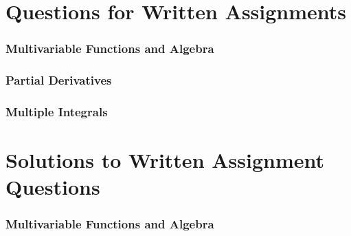\documentclass{article}
\begin{document}
\maketitle  %
\tableofcontents
\newpage
\part{Questions for Written Assignments}
\setcounter{section}{1}
\section{Multivariable Functions and Algebra}
\newpage %
\section{Partial Derivatives} %
\newpage %
\section{Multiple Integrals}





\newpage
\part{Solutions to Written Assignment Questions}
\setcounter{section}{1}

\section{Multivariable Functions and Algebra}
 \newpage %
 \newpage %
 \newpage %
 \newpage %
 \newpage %
 \newpage %
 \newpage %
\end{document}
